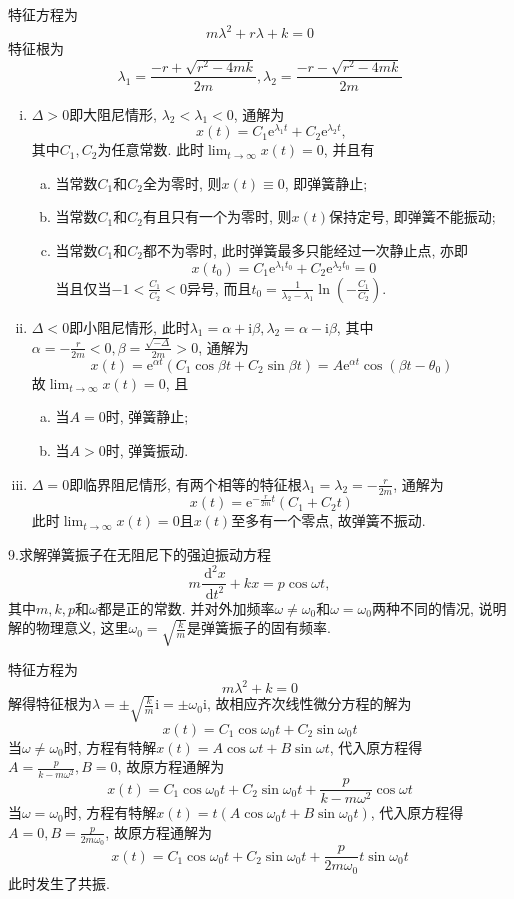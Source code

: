 \documentclass[titlepage,11pt,a4paper,twoside]{report}
\makeatletter
\newcommand\diff{\,\mathrm{d}}
\newcommand\e{\mathrm{e}}
\newcommand\ii{\mathrm{i}}
\newenvironment{solve}{\par
	\pushQED{\qed}%
	\normalfont \topsep1\p@\@plus6\p@\relax
	\trivlist
	\item\relax
	{\hspace*{\parindent}{\heiti 解}\@addpunct{:}}\hspace\labelsep\ignorespaces
}{%
	\popQED\endtrivlist\@endpefalse
}
\makeatother
\begin{document}
\begin{solve}
特征方程为\[m\lambda^2+r\lambda+k=0\]
特征根为\[\lambda_1=\frac{-r+\sqrt{r^2-4mk}}{2m},\lambda_2=\frac{-r-\sqrt{r^2-4mk}}{2m}\]
\begin{enumerate}[(i)]
\item $\Delta>0$即大阻尼情形, $\lambda_2<\lambda_1<0$, 通解为
\[x(t)=C_1\e^{\lambda_1t}+C_2\e^{\lambda_2t},\]
其中$C_1,C_2$为任意常数. 此时$\lim_{t\to\infty}x(t)=0$, 并且有
\begin{enumerate}[(a)]
\item 当常数$C_1$和$C_2$全为零时, 则$x(t)\equiv0$, 即弹簧静止;
\item 当常数$C_1$和$C_2$有且只有一个为零时, 则$x(t)$保持定号, 即弹簧不能振动;
\item 当常数$C_1$和$C_2$都不为零时, 此时弹簧最多只能经过一次静止点, 亦即
\[x(t_0)=C_1\e^{\lambda_1t_0}+C_2\e^{\lambda_2t_0}=0\]
当且仅当$-1<\frac{C_1}{C_2}<0$异号, 而且$t_0=\frac{1}{\lambda_2-\lambda_1}\ln\left(-\frac{C_1}{C_2}\right)$.
\end{enumerate}
\item $\Delta<0$即小阻尼情形, 此时$\lambda_1=\alpha+\ii\beta,\lambda_2=\alpha-\ii\beta$, 其中$\alpha=-\frac{r}{2m}<0,\beta=\frac{\sqrt{-\Delta}}{2m}>0$, 通解为
\[x(t)=\e^{\alpha t}(C_1\cos\beta t+C_2\sin\beta t)=A\e^{\alpha t}\cos(\beta t-\theta_0)\]
故$\lim_{t\to\infty}x(t)=0$, 且
\begin{enumerate}[(a)]
\item 当$A=0$时, 弹簧静止;
\item 当$A>0$时, 弹簧振动.
\end{enumerate}
\item $\Delta=0$即临界阻尼情形, 有两个相等的特征根$\lambda_1=\lambda_2=-\frac{r}{2m}$, 通解为
\[x(t)=\e^{-\frac{r}{2m}t}(C_1+C_2t)\]
此时$\lim_{t\to\infty}x(t)=0$且$x(t)$至多有一个零点, 故弹簧不振动.
\end{enumerate}
\end{solve}
9.求解弹簧振子在无阻尼下的强迫振动方程
\[m\frac{\diff^2x}{\diff t^2}+kx=p\cos\omega t,\]
其中$m,k,p$和$\omega$都是正的常数. 并对外加频率$\omega\neq\omega_0$和$\omega=\omega_0$两种不同的情况, 说明解的物理意义, 这里$\omega_0=\sqrt{\frac{k}{m}}$是弹簧振子的固有频率.
\begin{solve}
特征方程为
\[m\lambda^2+k=0\]
解得特征根为$\lambda=\pm\sqrt{\frac{k}{m}}\ii=\pm\omega_0\ii$, 故相应齐次线性微分方程的解为
\[x(t)=C_1\cos\omega_0t+C_2\sin\omega_0t\]
当$\omega\neq\omega_0$时, 方程有特解$x(t)=A\cos\omega t+B\sin\omega t$, 代入原方程得$A=\frac{p}{k-m\omega^2},B=0$, 故原方程通解为
\[x(t)=C_1\cos\omega_0t+C_2\sin\omega_0t+\frac{p}{k-m\omega^2}\cos\omega t\]
当$\omega=\omega_0$时, 方程有特解$x(t)=t(A\cos\omega_0t+B\sin\omega_0t)$, 代入原方程得$A=0,B=\frac{p}{2m\omega_0}$, 故原方程通解为
\[x(t)=C_1\cos\omega_0t+C_2\sin\omega_0t+\frac{p}{2m\omega_0}t\sin\omega_0t\]
此时发生了共振.
\end{solve}
\end{document}
